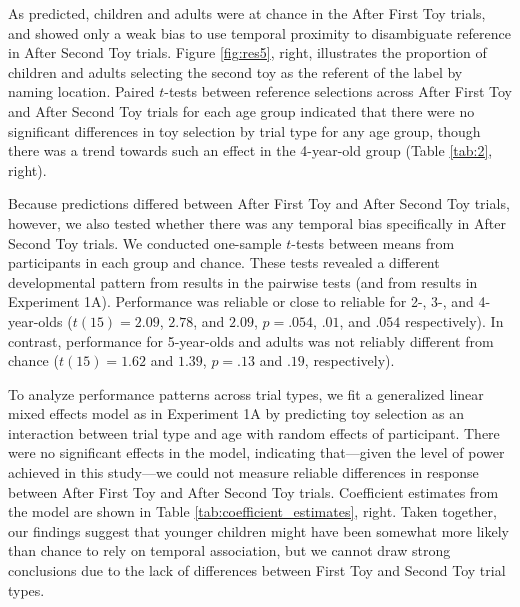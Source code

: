 \documentclass[man]{apa2}
\begin{document}
As predicted, children and adults were at chance in the After First Toy trials, and showed only a weak bias to use temporal proximity to disambiguate reference in After Second Toy trials. Figure \ref{fig:res5}, right, illustrates the proportion of children and adults selecting the second toy as the referent of the label by naming location.  Paired $t$-tests between reference selections across After First Toy and After Second Toy trials for each age group indicated that there were no significant differences in toy selection by trial type for any age group, though there was a trend towards such an effect in the 4-year-old group (Table \ref{tab:2}, right). 






Because predictions differed between After First Toy and After Second Toy trials, however, we also tested whether there was any temporal bias specifically in After Second Toy trials. We conducted one-sample $t$-tests between means from participants in each group and chance. These tests revealed a different developmental pattern from results in the pairwise tests (and from results in Experiment 1A). Performance was reliable or close to reliable for 2-, 3-, and 4-year-olds ($t(15) = 2.09$, $2.78$, and $2.09$, $p = .054$, $.01$, and $.054$ respectively). In contrast, performance for 5-year-olds and adults was not reliably different from chance ($t(15) = 1.62$ and $1.39$, $p = .13$ and $.19$, respectively). 

To analyze performance patterns across trial types, we fit a generalized linear mixed effects model as in Experiment 1A by predicting toy selection as an interaction between trial type and age with random effects of participant.  There were no significant effects in the model, indicating that---given the level of power achieved in this study---we could not measure reliable differences in response between After First Toy and After Second Toy trials. Coefficient estimates from the model are shown in Table \ref{tab:coefficient_estimates}, right. Taken together, our findings suggest that younger children might have been somewhat more likely than chance to rely on temporal association, but we cannot draw strong conclusions due to the lack of differences between First Toy and Second Toy trial types. 
\end{document}
